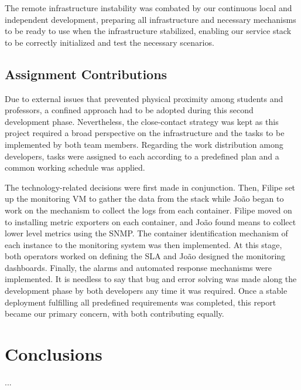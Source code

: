 \documentclass[12pt]{article}
\begin{document}
The remote infrastructure instability was combated by our continuous local and independent development, preparing all infrastructure and necessary mechanisms to be ready to use when the infrastructure stabilized, enabling our service stack to be correctly initialized and test the necessary scenarios.

\subsection{Assignment Contributions} \label{remarks.contributions} %


Due to external issues that prevented physical proximity among students and professors, a confined approach had to be adopted during this second development phase.
Nevertheless, the close-contact strategy was kept as this project required a broad perspective on the infrastructure and the tasks to be implemented by both team members.
Regarding the work distribution among developers, tasks were assigned to each according to a predefined plan and a common working schedule was applied.

The technology-related decisions were first made in conjunction.
Then, Filipe set up the monitoring VM to gather the data from the stack while João began to work on the mechanism to collect the logs from each container.
Filipe moved on to installing metric exporters on each container, and João found means to collect lower level metrics using the SNMP.
The container identification mechanism of each instance to the monitoring system was then implemented.
At this stage, both operators worked on defining the SLA and João designed the monitoring dashboards.
Finally, the alarms and automated response mechanisms were implemented.
It is needless to say that bug and error solving was made along the development phase by both developers any time it was required.
Once a stable deployment fulfilling all predefined requirements was completed, this report became our primary concern, with both contributing equally.

\section*{Conclusions} \label{conclusions} %

...
\end{document}
